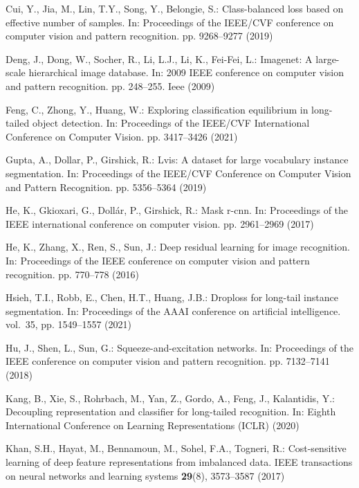 \documentclass[runningheads]{llncs}
\begin{document}
\begin{thebibliography}{10}
Cui, Y., Jia, M., Lin, T.Y., Song, Y., Belongie, S.: Class-balanced loss based
  on effective number of samples. In: Proceedings of the IEEE/CVF conference on
  computer vision and pattern recognition. pp. 9268--9277 (2019)

Deng, J., Dong, W., Socher, R., Li, L.J., Li, K., Fei-Fei, L.: Imagenet: A
  large-scale hierarchical image database. In: 2009 IEEE conference on computer
  vision and pattern recognition. pp. 248--255. Ieee (2009)

Feng, C., Zhong, Y., Huang, W.: Exploring classification equilibrium in
  long-tailed object detection. In: Proceedings of the IEEE/CVF International
  Conference on Computer Vision. pp. 3417--3426 (2021)

Gupta, A., Dollar, P., Girshick, R.: Lvis: A dataset for large vocabulary
  instance segmentation. In: Proceedings of the IEEE/CVF Conference on Computer
  Vision and Pattern Recognition. pp. 5356--5364 (2019)

He, K., Gkioxari, G., Doll{\'a}r, P., Girshick, R.: Mask r-cnn. In: Proceedings
  of the IEEE international conference on computer vision. pp. 2961--2969
  (2017)

He, K., Zhang, X., Ren, S., Sun, J.: Deep residual learning for image
  recognition. In: Proceedings of the IEEE conference on computer vision and
  pattern recognition. pp. 770--778 (2016)

Hsieh, T.I., Robb, E., Chen, H.T., Huang, J.B.: Droploss for long-tail instance
  segmentation. In: Proceedings of the AAAI conference on artificial
  intelligence. vol.~35, pp. 1549--1557 (2021)

Hu, J., Shen, L., Sun, G.: Squeeze-and-excitation networks. In: Proceedings of
  the IEEE conference on computer vision and pattern recognition. pp.
  7132--7141 (2018)

Kang, B., Xie, S., Rohrbach, M., Yan, Z., Gordo, A., Feng, J., Kalantidis, Y.:
  Decoupling representation and classifier for long-tailed recognition. In:
  Eighth International Conference on Learning Representations (ICLR) (2020)

Khan, S.H., Hayat, M., Bennamoun, M., Sohel, F.A., Togneri, R.: Cost-sensitive
  learning of deep feature representations from imbalanced data. IEEE
  transactions on neural networks and learning systems  \textbf{29}(8),
  3573--3587 (2017)


\end{thebibliography}
\end{document}
